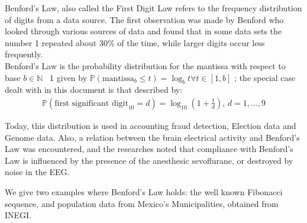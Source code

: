 Benford's Law, also called the First Digit Law refers to the frequency distribution of digits from a data source.  The first observation was made by Benford \cite{Benford38} who looked through various sources of data and found that in some data sets the number 1 repeated about 30\% of the time, while larger digits occur less frequently. \\

 Benford's Law is the probability distribution for the mantissa with respect to base $b \in \mathbb{N}$ \ {1} given by $\mathbb{P}(\text{mantissa}_b \leq t)=\log_b t \forall t \in [1,b]$ ; the special case dealt with in this document is that described by:\\
\begin{align*}
\mathbb{P}(\text{first significant digit}_{10} = d) = \log_{10}(1+\frac{1}{d})\text{,   }d=1,...,9
\end{align*}


Today, this distribution is used in accounting fraud detection\cite{Nigrini97}, Election data and Genome data. Also, a relation between the brain electrical activity and Benford's Law was encountered, and the researches noted that compliance with Benford's Law is influenced by the presence of the anesthesic sevoflurane, or destroyed by noise in the EEG\cite{Kreuzer14}.

We give two examples where Benford's Law holds: the well known Fibonacci sequence, and population data from Mexico's Municipalities, obtained from INEGI.
